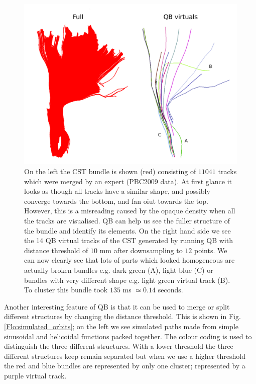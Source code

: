 \documentclass[preprint,authoryear,a4paper,10pt,onecolumn]{elsarticle}
\begin{document}
%
\begin{figure}
\begin{centering}
\includegraphics[scale=0.3]{last_figures/cst_simplification}
\par\end{centering}
\caption{On the left the CST bundle is shown (red) consisting of $11041$ tracks
  which were merged by an expert (PBC2009 data). At first glance it
  looks as though all tracks have a similar shape, and possibly converge
  towards the bottom, and fan oiut towards the top. However, this is a
  misreading caused by the opaque density when all the tracks are
  visualised.  QB can help us see the fuller structure of the bundle and
  identify its elements. On the right hand side we see the
  14 QB virtual tracks of the CST generated by running QB
  with distance threshold of $10$ mm after downsampling to $12$ points. We
  can now clearly see that lots of parts which looked homogeneous are
  actually broken bundles e.g. dark green (A), light blue (C) or bundles
  with very different shape e.g. light green virtual track (B). To
  cluster this bundle took $135$ ms $\simeq$$0.14$ seconds.\label{Flo:cst_pbc}}
\end{figure}

Another interesting feature of QB is that it can be used to merge
or split different structures by changing the distance threshold.
This is shown in Fig. \ref{Flo:simulated_orbits}; on the left we
see simulated paths made from simple sinusoidal and helicoidal functions
packed together. The colour coding is used to distinguish the three
different structures. With a lower threshold the three different structures
keep remain separated but when we use a higher threshold the red and
blue bundles are represented by only one cluster; represented by a
purple virtual track.
\end{document}
